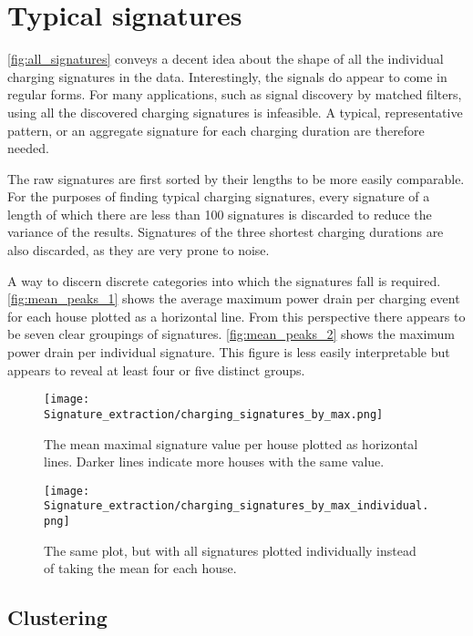 \documentclass[12pt, american]{report}
\begin{document}
\section{Typical signatures}
\autoref{fig:all_signatures} conveys a decent idea about the shape of all the individual charging signatures in the data. Interestingly, the signals do appear to come in regular forms. For many applications, such as signal discovery by matched filters, using all the discovered charging signatures is infeasible. A typical, representative pattern, or an aggregate signature for each charging duration are therefore needed.

The raw signatures are first sorted by their lengths to be more easily comparable. For the purposes of finding typical charging signatures, every signature of a length of which there are less than 100 signatures is discarded to reduce the variance of the results. Signatures of the three shortest charging durations are also discarded, as they are very prone to noise.

A way to discern discrete categories into which the signatures fall is required. \autoref{fig:mean_peaks_1} shows the average maximum power drain per charging event for each house plotted as a horizontal line. From this perspective there appears to be seven clear groupings of signatures. \autoref{fig:mean_peaks_2} shows the maximum power drain per individual signature. This figure is less easily interpretable but appears to reveal at least four or five distinct groups.

\begin{figure}[h]
\centering
\caption{The mean maximal signature value per house plotted as horizontal lines. Darker lines indicate more houses with the same value. }
\label{fig:mean_peaks_1}
\texttt{[image: Signature\_extraction/charging\_signatures\_by\_max.png]}
\end{figure}

\begin{figure}[h]
\centering
\caption{The same plot, but with all signatures plotted individually instead of taking the mean for each house.}
\label{fig:mean_peaks_2}
\texttt{[image: Signature\_extraction/charging\_signatures\_by\_max\_individual.png]}
\end{figure}



\subsection{Clustering}
\end{document}
